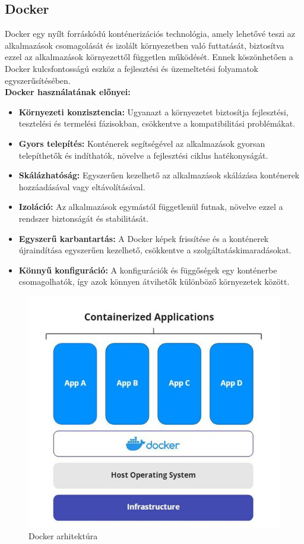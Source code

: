 \subsection{Docker}
Docker egy nyílt forráskódú konténerizációs technológia, amely lehetővé teszi az alkalmazások csomagolását és izolált környezetben való futtatását, biztosítva ezzel az alkalmazások környezettől független működését. Ennek köszönhetően a Docker kulcsfontosságú eszköz a fejlesztési és üzemeltetési folyamatok egyszerűsítésében.
\\
\textbf{Docker használatának előnyei:}
\begin{itemize}
  \item \textbf{Környezeti konzisztencia:} Ugyanazt a környezetet biztosítja fejlesztési, tesztelési és termelési fázisokban, csökkentve a kompatibilitási problémákat.
  \item \textbf{Gyors telepítés:} Konténerek segítségével az alkalmazások gyorsan telepíthetők és indíthatók, növelve a fejlesztési ciklus hatékonyságát.
  \item \textbf{Skálázhatóság:} Egyszerűen kezelhető az alkalmazások skálázása konténerek hozzáadásával vagy eltávolításával.
  \item \textbf{Izoláció:} Az alkalmazások egymástól függetlenül futnak, növelve ezzel a rendszer biztonságát és stabilitását.
  \item \textbf{Egyszerű karbantartás:} A Docker képek frissítése és a konténerek újraindítása egyszerűen kezelhető, csökkentve a szolgáltatáskimaradásokat.
  \item \textbf{Könnyű konfiguráció:} A konfigurációk és függőségek egy konténerbe csomagolhatók, így azok könnyen átvihetők különböző környezetek között.
\end{itemize}
\begin{figure}[H]
    \centering
    \includegraphics[width=14.0truecm]{images/docker.jpg}
    \caption{Docker\cite[]{docker} arhitektúra}
    \label{fig:docker}
\end{figure}
